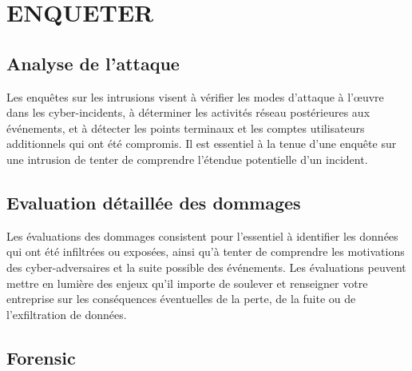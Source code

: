 %
%

\section{ENQUETER}
\subsection{Analyse de l'attaque}
Les enquêtes sur les intrusions visent à vérifier les modes d’attaque à l’œuvre dans les cyber-incidents, à déterminer les activités réseau postérieures aux événements, et à détecter les points terminaux et les comptes utilisateurs additionnels qui ont été compromis. Il est essentiel à la tenue d’une enquête sur une intrusion de tenter de comprendre l’étendue potentielle d’un incident.

\subsection{Evaluation détaillée des dommages}

Les évaluations des dommages consistent pour l’essentiel à identifier les données qui ont été infiltrées ou exposées, ainsi qu’à tenter de comprendre les motivations des cyber-adversaires et la suite possible des événements. Les évaluations peuvent mettre en lumière des enjeux qu’il importe de soulever et renseigner votre entreprise sur les conséquences éventuelles de la perte, de la fuite ou de l’exfiltration de données.




\subsection{Forensic}


